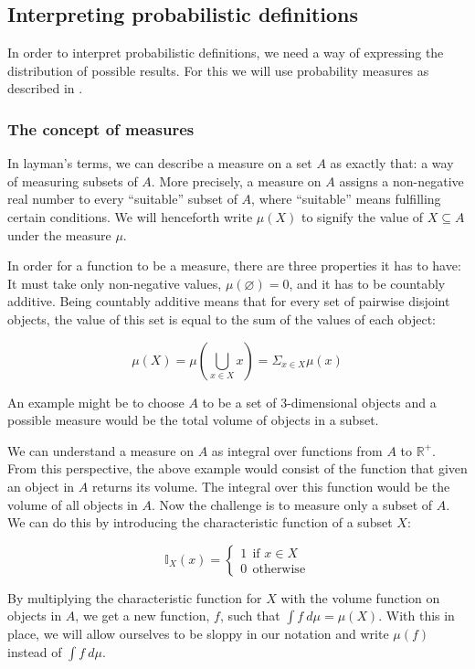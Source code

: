 \documentclass[11pt, leqno, titlepage]{article}
\theoremstyle{definition}
\begin{document}
\subsection{Interpreting probabilistic definitions}\label{sec:prob-interp}
In order to interpret probabilistic definitions, we need a way of expressing
the distribution of possible results. For this we will use probability measures as
described in \cite{rml-paper}.

\subsubsection{The concept of measures}
In layman's terms, we can describe a measure on a set $A$ as exactly that: a way of
measuring subsets of $A$. More precisely, a measure on $A$ assigns a non-negative
real number to every ``suitable'' subset of $A$, where ``suitable'' means fulfilling
certain conditions. We will henceforth write $\mu (X)$ to signify the value of $X
\subseteq A$ under the measure $\mu$.

In order for a function to be a measure, there are three properties it has to have:
It must take only non-negative values, $\mu (\varnothing) = 0$, and it has to be
countably additive. Being countably additive means that for every set of pairwise
disjoint objects, the value of this set is equal to the sum of the values of each
object:

\begin{equation*}
  \mu (X) = \mu(\bigcup_{x\in X} x) = \Sigma_{x\in X} \mu (x)
\end{equation*}

An example might be to choose $A$ to be a set of 3-dimensional objects and a possible
measure would be the total volume of objects in a subset. 

We can understand a measure on $A$ as integral
over functions from $A$ to $\mathbb{R}^+$. From this perspective, the above example
would consist of the function that given an object in $A$ returns its volume. The
integral over this function would be the volume of all objects in $A$. Now the
challenge is to measure only a subset of $A$. We can do this by introducing the
characteristic function of a subset $X$\cite{wiki-measure}:

$$\mathbb{I}_X(x)=
\begin{cases}
  1~~\text{if }x\in X\\
  0~~\text{otherwise}
\end{cases}$$

By multiplying the characteristic function for $X$ with the volume function on
objects in $A$, we get a new function, $f$, such that $\int f~d\mu = \mu(X)$. With
this in place, we will allow ourselves to be sloppy in our notation and write
$\mu(f)$ instead of $\int f~d\mu$.
\end{document}
